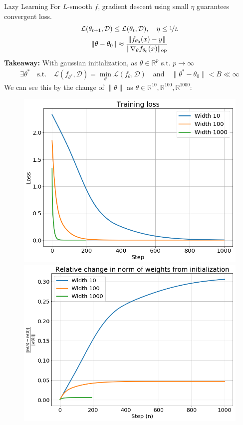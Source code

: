 \documentclass{beamer}
\begin{document}
\begin{frame}{Lazy Learning}
	For $L$-smooth $f$, gradient descent using small $\eta$ guarantees convergent loss. 
	\begin{gather}
		\mathcal{L}(\theta_{t+1}, \mathcal{D}) \leq \mathcal{L}(\theta_t, \mathcal{D}), \quad \eta \leq \nicefrac{1}{L} \\
		\| \theta - \theta_0 \| \approx \frac{\| f_{\theta_0}(x) - y \|}{\| \nabla_\theta f_{\theta_0}(x) \|_{\text{op}}}
	\end{gather} \pause
	\textbf{Takeaway:} With gaussian initialization, as $\theta \in \mathbb{R}^p$ s.t. $p \rightarrow \infty$
	\begin{gather}
		\exists \theta^* \quad \text{s.t.} \quad \mathcal{L}(f_{\theta^*}, \mathcal{D}) = \min_\theta \mathcal{L}(f_\theta, \mathcal{D}) \quad \text{and} \quad \| \theta^* - \theta_0 \| < B \ll \infty
	\end{gather} \pause
	We can see this by the change of $\| \theta \|$ as $\theta \in \mathbb{R}^{10}, \mathbb{R}^{100}, \mathbb{R}^{1000}$:
	\begin{figure}
		\centering
		\includegraphics[width=.35\textwidth]{img/losses_3widths.png}
		\hspace{1em}
		\includegraphics[width=.35\textwidth]{img/weightchange_3widths.png}
	\end{figure}
\end{frame}
\end{document}
